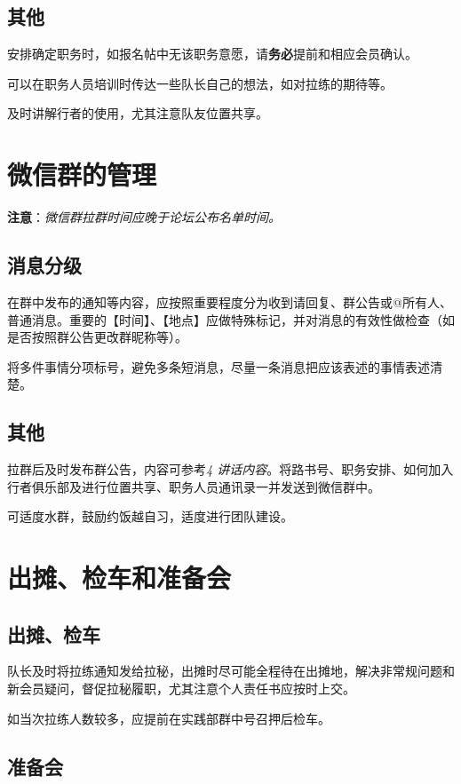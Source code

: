 \documentclass[UTF8]{ctexart}
\begin{document}
\subsection{其他}

安排确定职务时，如报名帖中无该职务意愿，请\textbf{务必}提前和相应会员确认。

可以在职务人员培训时传达一些队长自己的想法，如对拉练的期待等。

及时讲解行者的使用，尤其注意队友位置共享。

\section{微信群的管理}
\textbf{注意}：\textit{微信群拉群时间应晚于论坛公布名单时间。}

\subsection{消息分级}

在群中发布的通知等内容，应按照重要程度分为收到请回复、群公告或@所有人、普通消息。重要的【时间】、【地点】应做特殊标记，并对消息的有效性做检查（如是否按照群公告更改群昵称等）。

将多件事情分项标号，避免多条短消息，尽量一条消息把应该表述的事情表述清楚。

\subsection{其他}

拉群后及时发布群公告，内容可参考{\color{blue}\textit{4 讲话内容}}。将路书号、职务安排、如何加入行者俱乐部及进行位置共享、职务人员通讯录一并发送到微信群中。

可适度水群，鼓励约饭越自习，适度进行团队建设。

\section{出摊、检车和准备会}

\subsection{出摊、检车}

队长及时将拉练通知发给拉秘，出摊时尽可能全程待在出摊地，解决非常规问题和新会员疑问，督促拉秘履职，尤其注意个人责任书应按时上交。

如当次拉练人数较多，应提前在实践部群中号召押后检车。

\subsection{准备会}
\end{document}
